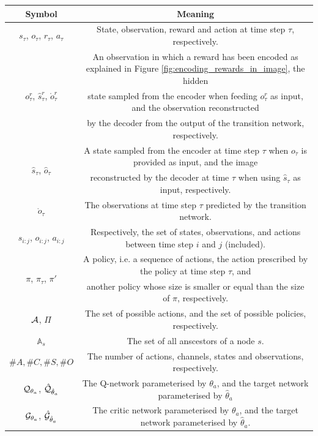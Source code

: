 \documentclass[twoside,11pt]{article}
\let\oldmathcal\mathcal
\renewcommand{\mathcal}[1]{%
  \IfSubStr{ABCDEFGHIJKLMNOPQRSTUVWXYZ}{#1}{\oldmathcal{#1}}{\mathdutchcal{#1}}
}
\begin{document}
\begin{table}[H]
\centering
\begin{tabular}{ |c|c|  }
 \hline
 Symbol & Meaning\\
 \hline
 \hline
 $s_\tau$, $o_\tau$, $r_\tau$, $a_\tau$ & State, observation, reward and action at time step $\tau$, respectively.\\
 \hline
 \multirow{3}{*}{$o_\tau^r$, $\hat{s}_\tau^r$, $\mathring{o}^r_\tau$} & An observation in which a reward has been encoded as explained in Figure \ref{fig:encoding_rewards_in_image}, the hidden \\
 &state sampled from the encoder when feeding $o_\tau^r$ as input, and the observation reconstructed \\
 &by the decoder from the output of the transition network, respectively.\\
 \hline
 \multirow{2}{*}{$\hat{s}_\tau$, $\hat{o}_\tau$} & A state sampled from the encoder at time step $\tau$ when $o_\tau$ is provided as input, and the image \\
 &reconstructed by the decoder at time $\tau$ when using $\hat{s}_\tau$ as input, respectively.\\
 \hline
  $\mathring{o}_\tau$ & The observations at time step $\tau$ predicted by the transition network.\\
 \hline
 $s_{i:j}$, $o_{i:j}$, $a_{i:j}$ & Respectively, the set of states, observations, and actions between time step $i$ and $j$ (included).\\
 \hline
 \multirow{2}{*}{$\pi$, $\pi_\tau$, $\pi'$} & A policy, i.e. a sequence of actions, the action prescribed by the policy at time step $\tau$, and \\
 & another policy whose size is smaller or equal than the size of $\pi$, respectively.\\
 \hline
 $\mathcal{A}$, $\Pi$ & The set of possible actions, and the set of possible policies, respectively.\\
 \hline
 $\mathbb{A}_s$ & The set of all anscestors of a node $s$.\\
 \hline
 $\#A, \#C, \#S, \#O$ & The number of actions, channels, states and observations, respectively.\\
 \hline
 $\mathcal{Q}_{\theta_a}$, $\hat{\mathcal{Q}}_{\hat{\theta}_a}$ & The Q-network parameterised by $\theta_a$, and the target network parameterised by $\hat{\theta}_a$\\
 \hline
 $\mathcal{G}_{\theta_a}$, $\hat{\mathcal{G}}_{\hat{\theta}_a}$ & The critic network parameterised by $\theta_a$, and the target network parameterised by $\hat{\theta}_a$.\\

\end{tabular}
\end{table}
\end{document}
